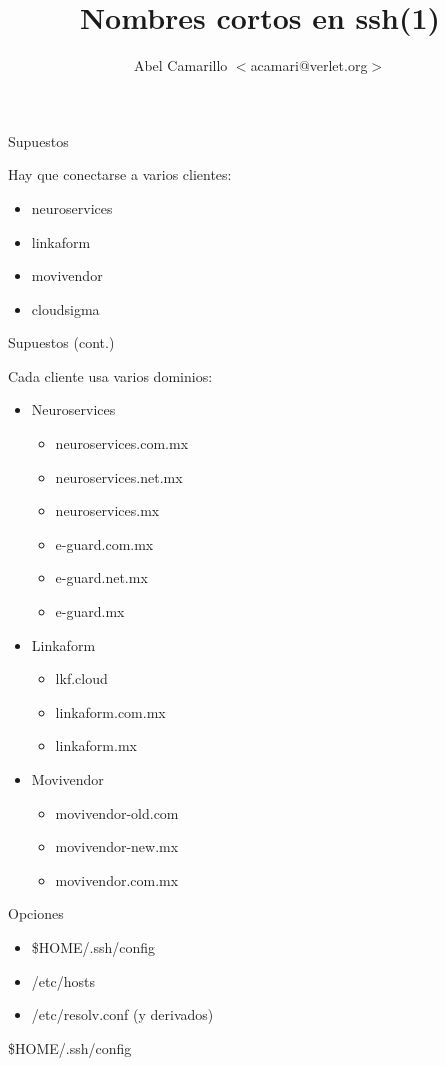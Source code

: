 \documentclass[11pt,spanish]{article}
\title{Nombres cortos en ssh(1)}
\author{Abel Camarillo $<$acamari@verlet.org$>$}
\newcommand{\rowsp}[1][1em]{\vspace{#1}}
\newcommand{\hone}[1]{{\rowsp[0.3em]\noindent\Large #1 \rowsp[0.3em]}}
\newcommand{\myitm}[1]{\begin{itemize}#1\end{itemize}}
\begin{document}
\maketitle
\thispagestyle{empty}


\newpage %
\hone{Supuestos}

Hay que conectarse a varios clientes:
\myitm{
	\item neuroservices
	\item linkaform
	\item movivendor
	\item cloudsigma
}

\newpage %

\hone{Supuestos (cont.)}

Cada cliente usa varios dominios:
\begin{multicols}{2}
\myitm{
	\item Neuroservices
	\myitm{
		\item neuroservices.com.mx
		\item neuroservices.net.mx
		\item neuroservices.mx
		\item e-guard.com.mx
		\item e-guard.net.mx
		\item e-guard.mx
	}

	\item Linkaform
	\myitm{
		\item lkf.cloud
		\item linkaform.com.mx
		\item linkaform.mx
	}
	\columnbreak

	\item Movivendor
	\myitm{
		\item movivendor-old.com
		\item movivendor-new.mx
		\item movivendor.com.mx
	}

}
\end{multicols}

\newpage %

\hone{Opciones}

\myitm{
	\item \$HOME/.ssh/config
	\item /etc/hosts
	\item /etc/resolv.conf (y derivados)
}

\newpage %

\hone{\$HOME/.ssh/config}
\end{document}
